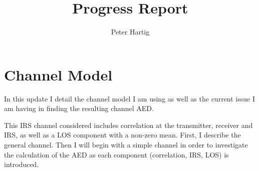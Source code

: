 \documentclass[12pt,a4paper]{report}
\title{Progress Report}
\author{Peter Hartig}
\begin{document}
\maketitle
\tableofcontents

\section{Channel Model}
In this update I detail the channel model I am using as well as the current issue I am having in finding the resulting channel AED. 
\par
This IRS channel considered includes correlation at the transmitter, receiver and IRS, as well as a LOS component with a non-zero mean. First, I describe the general channel. Then I will begin with a simple channel in order to investigate the calculation of the AED as each component (correlation, IRS, LOS) is introduced. 
\end{document}
